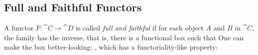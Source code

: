 \subsection{Full and Faithful Functors}

A functor $F : \cat{C} \to \cat{D}$ is called \textit{full and faithful} %
if for each object $A$ and $B$ in $\cat{C}$, the family 
has the inverse, that is, there is a functional box such that
One can make the box better-looking:
, which has a functoriality-like property:
